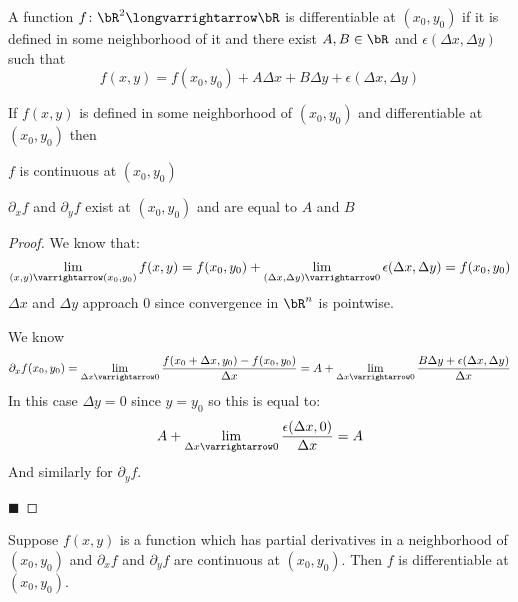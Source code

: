\documentclass[10pt]{article}
\begin{document}
\begin{defn*}

    A function $f\colon\bR^2\longvarrightarrow\bR$ is differentiable at $(x_0,y_0)$ if it is defined in some neighborhood of it and there exist $A,B\in\bR$ and $\epsilon(\Delta x,\Delta y)$ such that
    \[ f(x,y) = f(x_0,y_0) + A\Delta x + B\Delta y + \epsilon(\Delta x,\Delta y) \]

\end{defn*}

\begin{prop*}

    If $f(x,y)$ is defined in some neighborhood of $(x_0,y_0)$ and differentiable at $(x_0,y_0)$ then
    \benum
        \item $f$ is continuous at $(x_0,y_0)$
        \item $\partial_x f$ and $\partial_y f$ exist at $(x_0,y_0)$ and are equal to $A$ and $B$
    \eenum

\end{prop*}

\begin{proof}

    \benum
        \item We know that:
        \[ \lim_{(x,y)\varrightarrow(x_0,y_0)}f(x,y) = f(x_0,y_0) + \lim_{(\Delta x,\Delta y)\varrightarrow0}\epsilon(\Delta x,\Delta y) = f(x_0,y_0) \]
        $\Delta x$ and $\Delta y$ approach $0$ since convergence in $\bR^n$ is pointwise.

        \item We know
        \[ \partial_x f(x_0, y_0) = \lim_{\Delta x\varrightarrow0}\frac{f(x_0+\Delta x,y_0)-f(x_0,y_0)}{\Delta x} = A + \lim_{\Delta x\varrightarrow0}\frac{B\Delta y+\epsilon(\Delta x,\Delta y)}{\Delta x} \]
        In this case $\Delta y=0$ since $y=y_0$ so this is equal to:
        \[ A + \lim_{\Delta x\varrightarrow0}\frac{\epsilon(\Delta x,0)}{\Delta x} = A \]
        And similarly for $\partial_y f$.
    \eenum

    \hfill$\blacksquare$

\end{proof}

\begin{prop*}

    Suppose $f(x,y)$ is a function which has partial derivatives in a neighborhood of $(x_0,y_0)$ and $\partial_x f$ and $\partial_y f$ are continuous at $(x_0,y_0)$.
    Then $f$ is differentiable at $(x_0,y_0)$.

\end{prop*}
\end{document}
